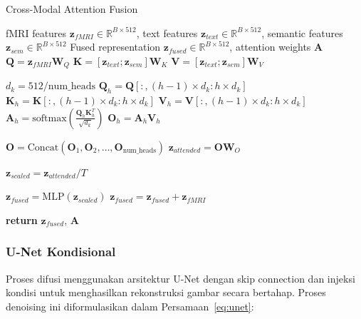 \begin{algorithm}[htbp]
\caption{Cross-Modal Attention Fusion}
\label{alg:fusion}
\begin{algorithmic}[1]
\Require fMRI features $\mathbf{z}_{fMRI} \in \mathbb{R}^{B \times 512}$, text features $\mathbf{z}_{text} \in \mathbb{R}^{B \times 512}$, semantic features $\mathbf{z}_{sem} \in \mathbb{R}^{B \times 512}$
\Ensure Fused representation $\mathbf{z}_{fused} \in \mathbb{R}^{B \times 512}$, attention weights $\mathbf{A}$
\State {}
\State $\mathbf{Q} = \mathbf{z}_{fMRI} \mathbf{W}_Q$ 
\State $\mathbf{K} = [\mathbf{z}_{text}; \mathbf{z}_{sem}] \mathbf{W}_K$ 
\State $\mathbf{V} = [\mathbf{z}_{text}; \mathbf{z}_{sem}] \mathbf{W}_V$

\State {}
\State $d_k = 512 / \text{num\_heads}$ 
    \State $\mathbf{Q}_h = \mathbf{Q}[:, (h-1) \times d_k : h \times d_k]$
    \State $\mathbf{K}_h = \mathbf{K}[:, (h-1) \times d_k : h \times d_k]$
    \State $\mathbf{V}_h = \mathbf{V}[:, (h-1) \times d_k : h \times d_k]$
    \State $\mathbf{A}_h = \text{softmax}\left(\frac{\mathbf{Q}_h \mathbf{K}_h^T}{\sqrt{d_k}}\right)$
    \State $\mathbf{O}_h = \mathbf{A}_h \mathbf{V}_h$
\EndFor

\State {}
\State $\mathbf{O} = \text{Concat}(\mathbf{O}_1, \mathbf{O}_2, \ldots, \mathbf{O}_{\text{num\_heads}})$
\State $\mathbf{z}_{attended} = \mathbf{O} \mathbf{W}_O$

\State {}
\State $\mathbf{z}_{scaled} = \mathbf{z}_{attended} / T$ 

\State {}
\State $\mathbf{z}_{fused} = \text{MLP}(\mathbf{z}_{scaled})$ 
\State $\mathbf{z}_{fused} = \mathbf{z}_{fused} + \mathbf{z}_{fMRI}$ 

\State \textbf{return} $\mathbf{z}_{fused}$, $\mathbf{A}$
\end{algorithmic}
\end{algorithm}

\subsubsection{U-Net Kondisional}
Proses difusi menggunakan arsitektur U-Net dengan skip connection dan injeksi kondisi untuk menghasilkan rekonstruksi gambar secara bertahap. Proses denoising ini diformulasikan dalam Persamaan~\ref{eq:unet}:

